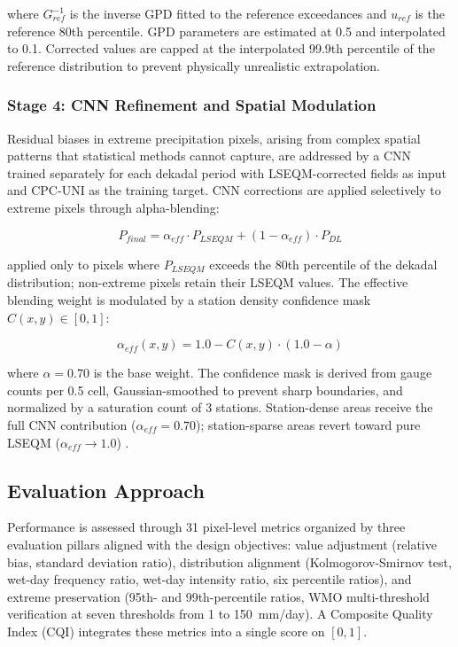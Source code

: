 \documentclass[11pt,a4paper]{article}
\begin{document}
where $G_{ref}^{-1}$ is the inverse GPD fitted to the reference
exceedances and $u_{ref}$ is the reference 80th percentile. GPD
parameters are estimated at 0.5\textdegree{} and interpolated to
0.1\textdegree{}. Corrected values are capped at the interpolated
99.9th percentile of the reference distribution to prevent physically
unrealistic extrapolation.

\subsubsection{Stage 4: CNN Refinement and Spatial Modulation}
\label{sec:stage4}

Residual biases in extreme precipitation pixels, arising from complex
spatial patterns that statistical methods cannot capture, are addressed
by a CNN trained separately for each dekadal period with LSEQM-corrected
fields as input and CPC-UNI as the training target. CNN corrections are
applied selectively to extreme pixels through alpha-blending:

\begin{equation}
P_{final} = \alpha_{eff} \cdot P_{LSEQM} + (1 - \alpha_{eff}) \cdot P_{DL}
\label{eq:blend}
\end{equation}

applied only to pixels where $P_{LSEQM}$ exceeds the 80th percentile of
the dekadal distribution; non-extreme pixels retain their LSEQM values.
The effective blending weight is modulated by a station density
confidence mask $C(x,y) \in [0,1]$:

\begin{equation}
\alpha_{eff}(x,y) = 1.0 - C(x,y) \cdot (1.0 - \alpha)
\label{eq:mask}
\end{equation}

where $\alpha = 0.70$ is the base weight. The confidence mask is derived
from gauge counts per 0.5\textdegree{} cell, Gaussian-smoothed to
prevent sharp boundaries, and normalized by a saturation count of 3
stations. Station-dense areas receive the full CNN contribution
($\alpha_{eff} = 0.70$); station-sparse areas revert toward pure LSEQM
($\alpha_{eff} \to 1.0$) \cite{ref27}.

\subsection{Evaluation Approach}

Performance is assessed through 31 pixel-level metrics organized by
three evaluation pillars aligned with the design objectives: value
adjustment (relative bias, standard deviation ratio), distribution
alignment (Kolmogorov-Smirnov test, wet-day frequency ratio, wet-day
intensity ratio, six percentile ratios), and extreme preservation
(95th- and 99th-percentile ratios, WMO multi-threshold verification at
seven thresholds from 1 to 150~mm/day). A Composite Quality Index (CQI)
integrates these metrics into a single score on $[0,1]$.
\end{document}
